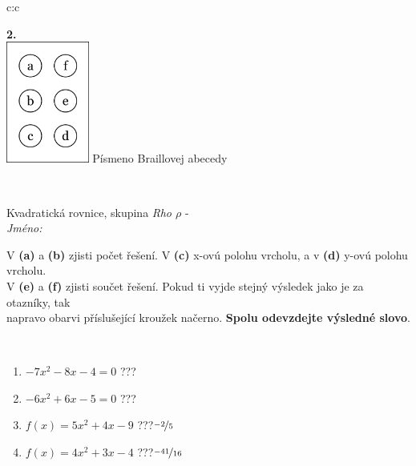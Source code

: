 \documentclass[10pt]{report}
\begin{document}
\begin{tabular}{c:c}
\begin{minipage}[c][104.5mm][t]{0.5\linewidth}
\begin{center}
\begin{minipage}{0.20\linewidth}
\begin{center}
{\Huge\bfseries 2.} \\[2mm]
\includegraphics[height=40mm]{../images/braille.png}
{\small Písmeno Braillovej abecedy}
\end{center}
\end{minipage}
\end{center}
\end{minipage}
\\ \hdashline
\begin{minipage}[c][104.5mm][t]{0.5\linewidth}
\begin{center}
\vspace{7mm}
{\huge Kvadratická rovnice, skupina \textit{Rho $\rho$} -}\\[5mm]
\textit{Jméno:}\phantom{xxxxxxxxxxxxxxxxxxxxxxxxxxxxxxxxxxxxxxxxxxxxxxxxxxxxxxxxxxxxxxxxx}\\[5mm]
\begin{minipage}{0.95\linewidth}
\begin{center}
V \textbf{(a)} a \textbf{(b)} zjisti počet řešení. V \textbf{(c)} x-ovú polohu vrcholu, a v \textbf{(d)} y-ovú polohu vrcholu.\\V \textbf{(e)} a \textbf{(f)} zjisti součet řešení. Pokud ti vyjde stejný výsledek jako je za otazníky, tak\\napravo obarvi příslušející kroužek načerno. \textbf{Spolu odevzdejte výsledné slovo}.
\end{center}
\end{minipage}
\\[1mm]
\begin{minipage}{0.79\linewidth}
\begin{center}
\begin{varwidth}{\linewidth}
\begin{enumerate}
\Large
\item $-7x^2-8x-4=0$\quad \dotfill\; ???\;\dotfill {}
\item $-6x^2+6x-5=0$\quad \dotfill\; ???\;\dotfill {}
\item $f(x)=5x^2+4x-9$\quad \dotfill\; ???\;\dotfill \quad $\nicefrac{-2}{5}$
\item $f(x)=4x^2+3x-4$\quad \dotfill\; ???\;\dotfill \quad $\nicefrac{-41}{16}$

\end{enumerate}
\end{varwidth}
\end{center}
\end{minipage}
\end{center}
\end{minipage}
\end{tabular}
\end{document}
